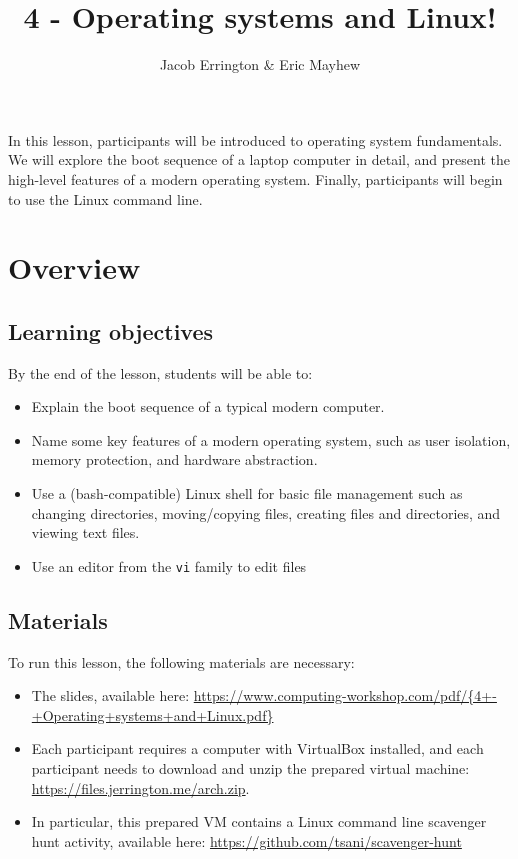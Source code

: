 \documentclass[11pt]{article}
\title{4 - Operating systems and Linux!}
\author{Jacob Errington \& Eric Mayhew}
\date{}
\newcommand{\cwurl}{https://www.computing-workshop.com/}
\newcommand{\cwpdf}{\cwurl pdf/}
\begin{document}
\maketitle

In this lesson, participants will be introduced to operating system
fundamentals. We will explore the boot sequence of a laptop computer in detail,
and present the high-level features of a modern operating system.
Finally, participants will begin to use the Linux command line.

\section*{Overview}

\subsection*{Learning objectives}

By the end of the lesson, students will be able to:
\begin{itemize}
\item
  Explain the boot sequence of a typical modern computer.
\item
  Name some key features of a modern operating system, such as user isolation,
  memory protection, and hardware abstraction.
\item
  Use a (bash-compatible) Linux shell for basic file management such as changing
  directories, moving/copying files, creating files and directories, and viewing
  text files.
\item
  Use an editor from the \texttt{vi} family to edit files
\end{itemize}

\subsection*{Materials}

To run this lesson, the following materials are necessary:

\begin{itemize}
\item
  The slides, available here:
  \url{\cwpdf{4+-+Operating+systems+and+Linux.pdf}}
\item
  Each participant requires a computer with VirtualBox installed, and each
  participant needs to download and unzip the prepared virtual machine:
  \url{https://files.jerrington.me/arch.zip}.

\item
  In particular, this prepared VM contains a Linux command line scavenger hunt
  activity, available here:
  \url{https://github.com/tsani/scavenger-hunt}
\end{itemize}
\end{document}
